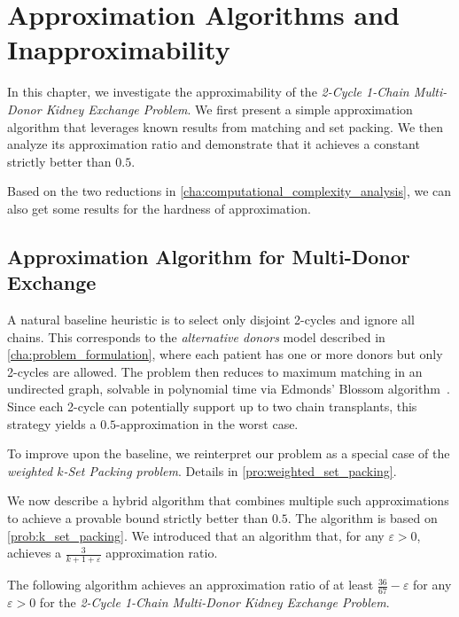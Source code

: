\chapter{Approximation Algorithms and Inapproximability}
\label{cha:approximation}

In this chapter, we investigate the approximability of the \textit{2-Cycle 1-Chain Multi-Donor Kidney Exchange Problem}. We first present a simple approximation algorithm that leverages known results from matching and set packing. We then analyze its approximation ratio and demonstrate that it achieves a constant strictly better than $0.5$.

Based on the two reductions in \autoref{cha:computational_complexity_analysis}, we can also get some results for the  hardness of approximation.


\section{Approximation Algorithm for Multi-Donor Exchange}

A natural baseline heuristic is to select only disjoint 2-cycles and ignore all chains. This corresponds to the \emph{alternative donors} model described in \autoref{cha:problem_formulation}, where each patient has one or more donors but only 2-cycles are allowed. The problem then reduces to maximum matching in an undirected graph, solvable in polynomial time via Edmonds' Blossom algorithm~\cite{edmonds1965paths}. Since each 2-cycle can potentially support up to two chain transplants, this strategy yields a $0.5$-approximation in the worst case.

To improve upon the baseline, we reinterpret our problem as a special case of the \textit{weighted $k$-Set Packing problem}. Details in \autoref{pro:weighted_set_packing}. %

We now describe a hybrid algorithm that combines multiple such approximations to achieve a provable bound strictly better than $0.5$. The algorithm is based on \autoref{prob:k_set_packing}. We introduced that an algorithm that, for any $\varepsilon > 0$, achieves a $\frac{3}{k + 1 + \varepsilon}$ approximation ratio. 

\begin{lemma}
The following algorithm achieves an approximation ratio of at least $\frac{36}{67} - \varepsilon$ for any $\varepsilon > 0$ for the \textit{2-Cycle 1-Chain Multi-Donor Kidney Exchange Problem}.
\end{lemma}

